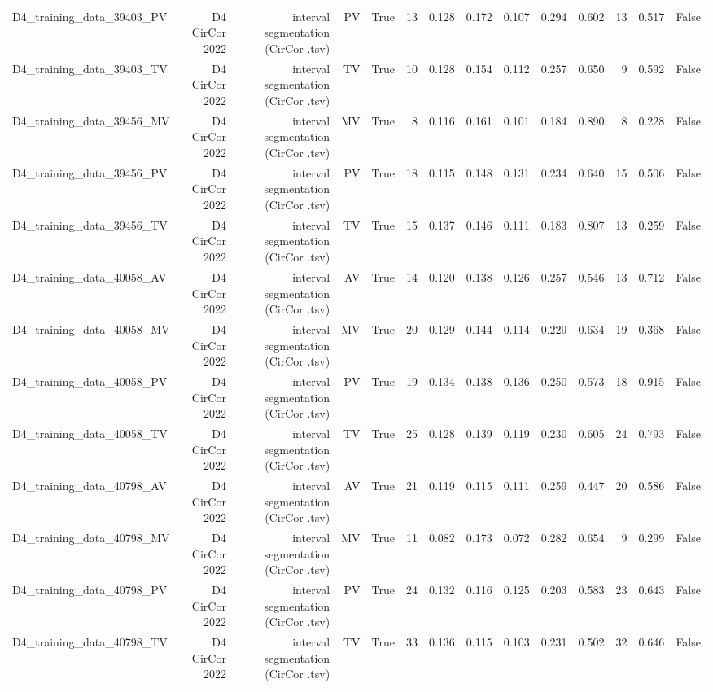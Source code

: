\begin{table}[htbp]
\begin{tabular}{lrrrrrrrrrrrrr}
    D4\_training\_data\_39403\_PV & D4 CirCor 2022 & interval segmentation (CirCor .tsv) & PV & True & 13 & 0.128 & 0.172 & 0.107 & 0.294 & 0.602 & 13 & 0.517 & False \\
    D4\_training\_data\_39403\_TV & D4 CirCor 2022 & interval segmentation (CirCor .tsv) & TV & True & 10 & 0.128 & 0.154 & 0.112 & 0.257 & 0.650 & 9 & 0.592 & False \\
    D4\_training\_data\_39456\_MV & D4 CirCor 2022 & interval segmentation (CirCor .tsv) & MV & True & 8 & 0.116 & 0.161 & 0.101 & 0.184 & 0.890 & 8 & 0.228 & False \\
    D4\_training\_data\_39456\_PV & D4 CirCor 2022 & interval segmentation (CirCor .tsv) & PV & True & 18 & 0.115 & 0.148 & 0.131 & 0.234 & 0.640 & 15 & 0.506 & False \\
    D4\_training\_data\_39456\_TV & D4 CirCor 2022 & interval segmentation (CirCor .tsv) & TV & True & 15 & 0.137 & 0.146 & 0.111 & 0.183 & 0.807 & 13 & 0.259 & False \\
    D4\_training\_data\_40058\_AV & D4 CirCor 2022 & interval segmentation (CirCor .tsv) & AV & True & 14 & 0.120 & 0.138 & 0.126 & 0.257 & 0.546 & 13 & 0.712 & False \\
    D4\_training\_data\_40058\_MV & D4 CirCor 2022 & interval segmentation (CirCor .tsv) & MV & True & 20 & 0.129 & 0.144 & 0.114 & 0.229 & 0.634 & 19 & 0.368 & False \\
    D4\_training\_data\_40058\_PV & D4 CirCor 2022 & interval segmentation (CirCor .tsv) & PV & True & 19 & 0.134 & 0.138 & 0.136 & 0.250 & 0.573 & 18 & 0.915 & False \\
    D4\_training\_data\_40058\_TV & D4 CirCor 2022 & interval segmentation (CirCor .tsv) & TV & True & 25 & 0.128 & 0.139 & 0.119 & 0.230 & 0.605 & 24 & 0.793 & False \\
    D4\_training\_data\_40798\_AV & D4 CirCor 2022 & interval segmentation (CirCor .tsv) & AV & True & 21 & 0.119 & 0.115 & 0.111 & 0.259 & 0.447 & 20 & 0.586 & False \\
    D4\_training\_data\_40798\_MV & D4 CirCor 2022 & interval segmentation (CirCor .tsv) & MV & True & 11 & 0.082 & 0.173 & 0.072 & 0.282 & 0.654 & 9 & 0.299 & False \\
    D4\_training\_data\_40798\_PV & D4 CirCor 2022 & interval segmentation (CirCor .tsv) & PV & True & 24 & 0.132 & 0.116 & 0.125 & 0.203 & 0.583 & 23 & 0.643 & False \\
    D4\_training\_data\_40798\_TV & D4 CirCor 2022 & interval segmentation (CirCor .tsv) & TV & True & 33 & 0.136 & 0.115 & 0.103 & 0.231 & 0.502 & 32 & 0.646 & False \\

\end{tabular}
\end{table}
